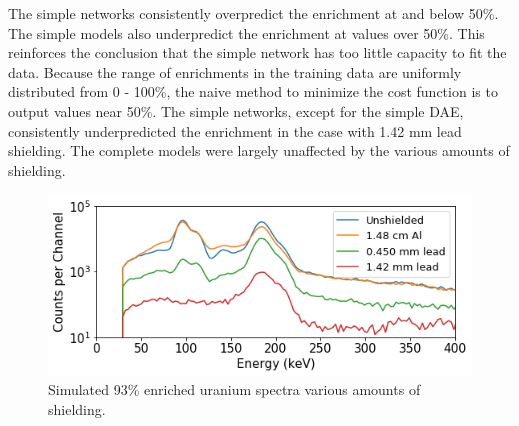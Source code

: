 The simple networks consistently overpredict the enrichment at and below 50\%. The simple models also underpredict the enrichment at values over 50\%. This reinforces the conclusion that the simple network has too little capacity to fit the data. Because the range of enrichments in the training data are uniformly distributed from 0 - 100\%, the naive method to minimize the cost function is to output values near 50\%. The simple networks, except for the simple DAE, consistently underpredicted the enrichment in the case with 1.42 mm lead shielding. The complete models were largely unaffected by the various amounts of shielding.


\begin{figure}[H]
	\centering
	\includegraphics[width=0.8\linewidth]{images/simulated_uranium_shielding.png}
	\caption{Simulated 93\% enriched uranium spectra various amounts of shielding.}
	\label{fig:simulated_uranium_shielding}
\end{figure}

